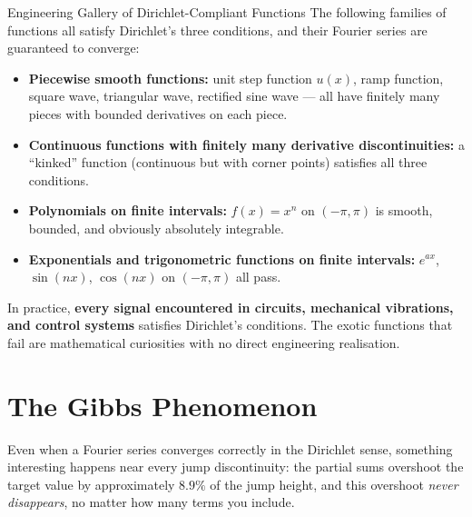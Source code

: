 \documentclass[12pt,a4paper]{article}
\begin{document}
\begin{infobox}{Engineering Gallery of Dirichlet-Compliant Functions}
The following families of functions all satisfy Dirichlet's three conditions, and their Fourier series are guaranteed to converge:

\begin{itemize}[noitemsep]
   \item \textbf{Piecewise smooth functions:} unit step function $u(x)$, ramp function, square wave, triangular wave, rectified sine wave --- all have finitely many pieces with bounded derivatives on each piece.
   \item \textbf{Continuous functions with finitely many derivative discontinuities:} a ``kinked'' function (continuous but with corner points) satisfies all three conditions.
   \item \textbf{Polynomials on finite intervals:} $f(x)=x^n$ on $(-\pi,\pi)$ is smooth, bounded, and obviously absolutely integrable.
   \item \textbf{Exponentials and trigonometric functions on finite intervals:} $e^{ax}$, $\sin(nx)$, $\cos(nx)$ on $(-\pi,\pi)$ all pass.
\end{itemize}

\medskip
In practice, \textbf{every signal encountered in circuits, mechanical vibrations, and control systems} satisfies Dirichlet's conditions. The exotic functions that fail are mathematical curiosities with no direct engineering realisation.
\end{infobox}

\section{The Gibbs Phenomenon}

Even when a Fourier series converges correctly in the Dirichlet sense, something interesting happens near every jump discontinuity: the partial sums overshoot the target value by approximately $8.9\%$ of the jump height, and this overshoot \emph{never disappears}, no matter how many terms you include.
\end{document}
